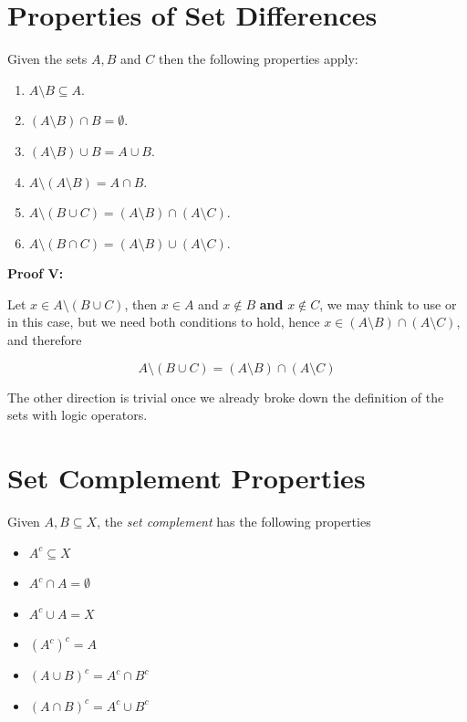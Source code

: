 \QED

\section{Properties of Set Differences}

Given the sets \(A,B\) and \(C\) then the following properties apply:

\begin{enumerate}

	\item \(A \setminus B \subseteq A\).

	\item \((A \setminus B) \cap B = \emptyset\).

	\item \((A \setminus B) \cup B = A \cup B\).

	\item \(A \setminus (A \setminus B) = A \cap B\).

	\item \(A \setminus (B \cup C) = (A \setminus B) \cap (A \setminus C)\).

	\item \(A \setminus (B \cap C) = (A \setminus B) \cup (A \setminus C)\).

\end{enumerate}

\textbf{Proof V:}

Let \(x \in A \setminus (B \cup C)\), then \(x \in A\) and \(x \notin B\) \textbf{and} \(x \notin C\), we may
think to use or in this case, but we need both conditions to hold, hence \(x \in (A \setminus B) \cap (A \setminus C)\), and therefore

\[
	A \setminus (B \cup C) = (A \setminus B) \cap (A \setminus C)
\]

The other direction is trivial once we already broke down the definition of the sets with logic operators.

\QED

\section{Set Complement Properties}

Given \(A, B \subseteq X\), the \emph{set complement} has the following properties

\begin{itemize}

	\item \(A^c \subseteq X\)

	\item \(A^c \cap A = \emptyset\)

	\item \(A^c \cup A = X\)

	\item \((A^c)^c = A\)

	\item \((A \cup B)^c = A^c \cap B^c\)

	\item \((A \cap B)^c = A^c \cup B^c\)

\end{itemize}

